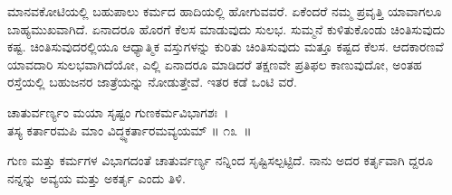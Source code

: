 ಮಾನವಕೋಟಿಯಲ್ಲಿ ಬಹುಪಾಲು ಕರ್ಮದ ಹಾದಿಯಲ್ಲಿ ಹೋಗುವವರೆ. ಏಕೆಂದರೆ ನಮ್ಮ ಪ್ರವೃತ್ತಿ ಯಾವಾಗಲೂ ಬಾಹ್ಯಮುಖವಾಗಿದೆ. ಏನಾದರೂ ಹೊರಗೆ ಕೆಲಸ ಮಾಡುವುದು ಸುಲಭ. ಸುಮ್ಮನೆ ಕುಳಿತುಕೊಂಡು ಚಿಂತಿಸುವುದು ಕಷ್ಟ. ಚಿಂತಿಸುವುದರಲ್ಲಿಯೂ ಆಧ್ಯಾತ್ಮಿಕ ವಸ್ತುಗಳನ್ನು ಕುರಿತು ಚಿಂತಿಸುವುದು ಮತ್ತೂ ಕಷ್ಟದ ಕೆಲಸ. ಆದಕಾರಣವೆ ಯಾವದಾರಿ ಸುಲಭವಾಗಿದೆಯೋ, ಎಲ್ಲಿ ಏನಾದರೂ ಮಾಡಿದರೆ ತಕ್ಷಣವೇ ಪ್ರತಿಫಲ ಕಾಣುವುದೋ, ಅಂತಹ ರಸ್ತೆಯಲ್ಲಿ ಬಹುಜನರ ಜಾತ್ರೆಯನ್ನು ನೋಡುತ್ತೇವೆ. ಇತರ ಕಡೆ ಒಂಟಿ ವರೆ.

\begin{shloka}
ಚಾತುರ್ವರ್ಣ್ಯಂ ಮಯಾ ಸೃಷ್ಟಂ ಗುಣಕರ್ಮವಿಭಾಗಶಃ~।\\ತಸ್ಯ ಕರ್ತಾರಮಪಿ ಮಾಂ ವಿದ್ಧ್ಯಕರ್ತಾರಮವ್ಯಯಮ್ \hfill॥ ೧೩~॥
\end{shloka}

\begin{artha}
ಗುಣ ಮತ್ತು ಕರ್ಮಗಳ ವಿಭಾಗದಂತೆ ಚಾತುರ್ವರ್ಣ್ಯ ನನ್ನಿಂದ ಸೃಷ್ಟಿಸಲ್ಪಟ್ಟಿದೆ. ನಾನು ಅದರ ಕರ್ತೃವಾಗಿ ದ್ದರೂ ನನ್ನನ್ನು ಅವ್ಯಯ ಮತ್ತು ಅಕರ್ತೃ ಎಂದು ತಿಳಿ.
\end{artha}

